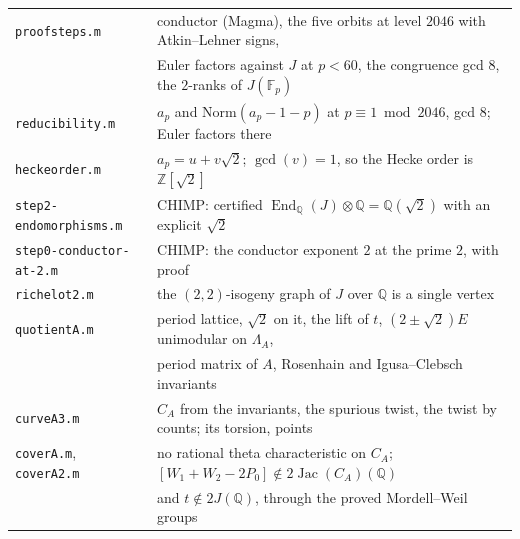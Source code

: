 \documentclass[11pt,reqno]{amsart}
\theoremstyle{plain}
\theoremstyle{definition}
\DeclareMathOperator{\Jac}{Jac}
\DeclareMathOperator{\End}{End}
\newcommand{\Q}{\mathbb{Q}}
\newcommand{\Z}{\mathbb{Z}}
\newcommand{\F}{\mathbb{F}}
\begin{document}
\begin{center}\small
\begin{tabular}{ll}
\toprule
\texttt{proofsteps.m} & conductor (Magma), the five orbits at level $2046$ with Atkin--Lehner signs,\\
 & Euler factors against $J$ at $p<60$, the congruence gcd $8$, the $2$-ranks of $J(\F_p)$\\
\texttt{reducibility.m} & $a_p$ and $\mathrm{Norm}(a_p-1-p)$ at $p\equiv1\bmod 2046$, gcd $8$; Euler factors there\\
\texttt{heckeorder.m} & $a_p=u+v\sqrt2$; $\gcd(v)=1$, so the Hecke order is $\Z[\sqrt2]$\\
\texttt{step2-endomorphisms.m} & CHIMP: certified $\End_\Q(J)\otimes\Q=\Q(\sqrt2)$ with an explicit $\sqrt2$\\
\texttt{step0-conductor-at-2.m} & CHIMP: the conductor exponent $2$ at the prime $2$, with proof\\
\texttt{richelot2.m} & the $(2,2)$-isogeny graph of $J$ over $\Q$ is a single vertex\\
\texttt{quotientA.m} & period lattice, $\sqrt2$ on it, the lift of $t$, $(2\pm\sqrt2)E$ unimodular on $\Lambda_A$,\\
 & period matrix of $A$, Rosenhain and Igusa--Clebsch invariants\\
\texttt{curveA3.m} & $C_A$ from the invariants, the spurious twist, the twist by counts; its torsion, points\\
\texttt{coverA.m}, \texttt{coverA2.m} & no rational theta characteristic on $C_A$; $[W_1+W_2-2P_0]\notin2\Jac(C_A)(\Q)$\\
 & and $t\notin2J(\Q)$, through the proved Mordell--Weil groups\\
\bottomrule
\end{tabular}
\end{center}
\end{document}
